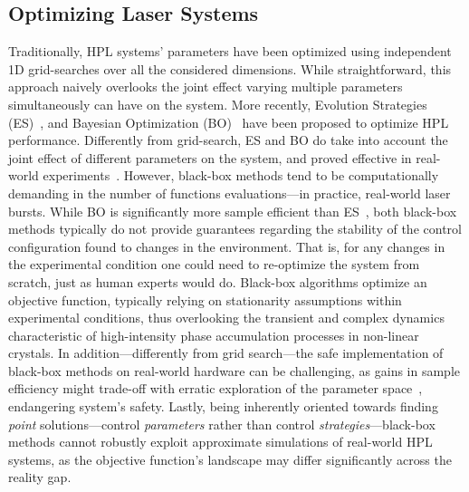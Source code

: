 \subsection{Optimizing Laser Systems}
Traditionally, HPL systems' parameters have been optimized using independent 1D grid-searches over all the considered dimensions. 
While straightforward, this approach naively overlooks the joint effect varying multiple parameters simultaneously can have on the system. 
More recently, Evolution Strategies (ES)~\citep{baumert1997femtosecond, arteaga2014supercontinuum, woodward2016towards}, and Bayesian Optimization (BO)~\citep{loughran2023automated, shalloo2020automation, capuano2022laser, anjum2024high} have been proposed to optimize HPL performance. 
Differently from grid-search, ES and BO do take into account the joint effect of different parameters on the system, and proved effective in real-world experiments~\citep{shalloo2020automation}. 
However, black-box methods tend to be computationally demanding in the number of functions evaluations---in practice, real-world laser bursts. 
While BO is significantly more sample efficient than ES~\citep{capuano2022laser}, both black-box methods typically do not provide guarantees regarding the stability of the control configuration found to changes in the environment.
That is, for any changes in the experimental condition one could need to re-optimize the system from scratch, just as human experts would do. 
Black-box algorithms optimize an objective function, typically relying on stationarity assumptions within experimental conditions, thus overlooking the transient and complex dynamics characteristic of high-intensity phase accumulation processes in non-linear crystals. 
In addition---differently from grid search---the safe implementation of black-box methods on real-world hardware can be challenging, as gains in sample efficiency might trade-off with erratic exploration of the parameter space~\citep{capuano2023temporl}, endangering system's safety.
Lastly, being inherently oriented towards finding \textit{point} solutions---control \textit{parameters} rather than control \textit{strategies}---black-box methods cannot robustly exploit approximate simulations of real-world HPL systems, as the objective function's landscape may differ significantly across the reality gap.


